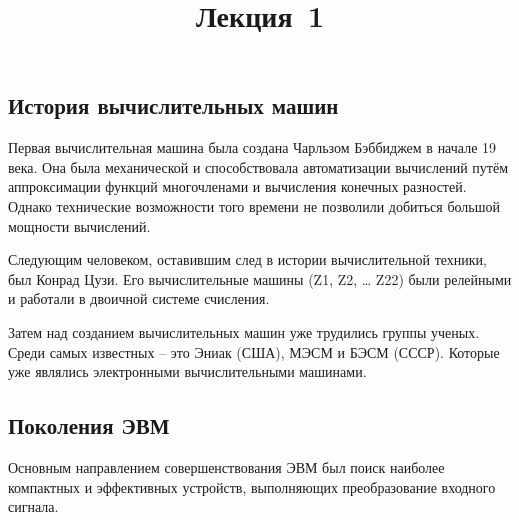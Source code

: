 \documentclass[a4paper, fleqn]{article}
\title{Лекция \textnumero\,1}
\author{}
\date{}
\begin{document}
	\maketitle
	\subsection*{История вычислительных машин}
		Первая вычислительная машина была создана  Чарльзом Бэббиджем в начале 19 века. Она была механической и способствовала автоматизации вычислений путём аппроксимации функций многочленами и вычисления конечных разностей. Однако технические возможности того времени не позволили добиться большой мощности вычислений.
		
		Следующим человеком, оставившим след в истории вычислительной техники, был Конрад Цузи. Его вычислительные машины (Z1, Z2, … Z22) были релейными и работали в двоичной системе счисления. 
		
		Затем над созданием вычислительных машин уже трудились группы ученых. Среди самых известных – это Эниак (США), МЭСМ и БЭСМ (СССР). Которые уже являлись электронными вычислительными машинами.
		
	\subsection*{Поколения ЭВМ}
	
		Основным направлением совершенствования ЭВМ был поиск наиболее компактных и эффективных устройств, выполняющих преобразование входного сигнала.
			
\end{document}
